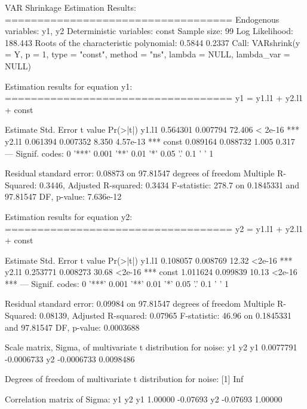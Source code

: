 \documentclass[
]{jss}
\begin{document}
\begin{CodeChunk}


\begin{CodeOutput}

VAR Shrinkage Estimation Results:
=================================== 
Endogenous variables: y1, y2 
Deterministic variables: const 
Sample size: 99 
Log Likelihood: 188.443 
Roots of the characteristic polynomial:
0.5844 0.2337
Call:
VARshrink(y = Y, p = 1, type = "const", method = "ns", lambda = NULL, 
    lambda_var = NULL)


Estimation results for equation y1: 
=================================== 
y1 = y1.l1 + y2.l1 + const 

      Estimate Std. Error t value Pr(>|t|)    
y1.l1 0.564301   0.007794  72.406  < 2e-16 ***
y2.l1 0.061394   0.007352   8.350 4.57e-13 ***
const 0.089164   0.088732   1.005    0.317    
---
Signif. codes:  0 '***' 0.001 '**' 0.01 '*' 0.05 '.' 0.1 ' ' 1


Residual standard error: 0.08873 on 97.81547 degrees of freedom
Multiple R-Squared: 0.3446, Adjusted R-squared: 0.3434 
F-statistic: 278.7 on 0.1845331 and 97.81547 DF,  p-value: 7.636e-12 


Estimation results for equation y2: 
=================================== 
y2 = y1.l1 + y2.l1 + const 

      Estimate Std. Error t value Pr(>|t|)    
y1.l1 0.108057   0.008769   12.32   <2e-16 ***
y2.l1 0.253771   0.008273   30.68   <2e-16 ***
const 1.011624   0.099839   10.13   <2e-16 ***
---
Signif. codes:  0 '***' 0.001 '**' 0.01 '*' 0.05 '.' 0.1 ' ' 1


Residual standard error: 0.09984 on 97.81547 degrees of freedom
Multiple R-Squared: 0.08139,    Adjusted R-squared: 0.07965 
F-statistic: 46.96 on 0.1845331 and 97.81547 DF,  p-value: 0.0003688 



Scale matrix, Sigma, of multivariate t distribution for noise:
           y1         y2
y1  0.0077791 -0.0006733
y2 -0.0006733  0.0098486

Degrees of freedom of multivariate t distribution for noise:
[1] Inf

Correlation matrix of Sigma:
         y1       y2
y1  1.00000 -0.07693
y2 -0.07693  1.00000
\end{CodeOutput}
\end{CodeChunk}
\end{document}
